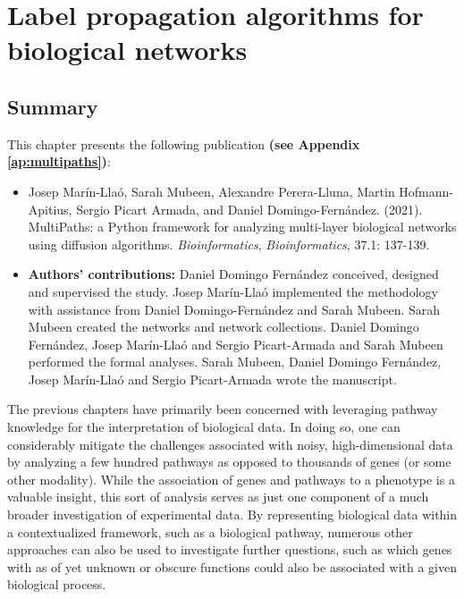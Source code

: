\chapter{Label propagation algorithms for biological networks}


\label{ch:multipaths}

\section*{Summary}

This chapter presents the following publication \textbf{(see Appendix \ref{ap:multipaths})}:

\begin{itemize}

\item[] Josep Marín-Llaó, Sarah Mubeen, Alexandre Perera-Lluna, Martin Hofmann-Apitius, Sergio Picart Armada, and Daniel Domingo-Fernández. (2021). MultiPaths: a Python framework for analyzing multi-layer biological networks using diffusion algorithms. \textit{Bioinformatics}, \textit{Bioinformatics}, 37.1: 137-139.

\item[] \textbf{Authors' contributions:} Daniel Domingo Fernández conceived, designed and supervised the study. Josep Marín-Llaó implemented the methodology with assistance from Daniel Domingo-Fernández and Sarah Mubeen. Sarah Mubeen created the networks and network collections. Daniel Domingo Fernández, Josep Marín-Llaó and Sergio Picart-Armada and Sarah Mubeen performed the formal analyses. Sarah Mubeen, Daniel Domingo Fernández, Josep Marín-Llaó and Sergio Picart-Armada wrote the manuscript.
\end{itemize}

\noindent
 The previous chapters have primarily been concerned with leveraging pathway knowledge for the interpretation of biological data. In doing so, one can considerably mitigate the challenges associated with noisy, high-dimensional data by analyzing a few hundred pathways as opposed to thousands of genes (or some other modality). While the association of genes and pathways to a phenotype is a valuable insight, this sort of analysis serves as just one component of a much broader investigation of experimental data. By representing biological data within a contextualized framework, such as a biological pathway, numerous other approaches can also be used to investigate further questions, such as which genes with as of yet unknown or obscure functions could also be associated with a given biological process. 
 
